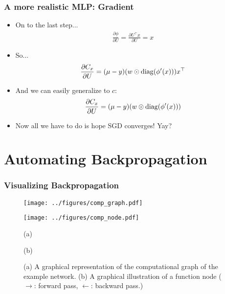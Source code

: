 \documentclass{beamer}
\begin{document}
\begin{frame}

\frametitle{A more realistic MLP: Gradient}


\begin{itemize}
\item On to the last step...
\begin{align*}
    \frac{\partial \underline{\phi}}{\partial U} = \frac{\partial U^\top
    x}{\partial U} = x
\end{align*}
\item So...
\begin{align} 
    \frac{\partial C_x}{\partial U} = (\mu - y) (w \odot \operatorname{diag}(\phi'(x)))
    x^\top
\end{align}
\item And we can easily generalize to $c$:
\begin{align} 
    \frac{\partial C_x}{\partial U} = (\mu - y) (w \odot \operatorname{diag}(\phi'(x)))
\end{align}
\item Now all we have to do is hope SGD converges! Yay?
\end{itemize}

\end{frame}

\section{Automating Backpropagation}

\begin{frame}
\frametitle{Visualizing Backpropagation}

\begin{figure}[ht]
    \centering
    \begin{minipage}{0.48\textwidth}
        \centering
        \texttt{[image: ../figures/comp\_graph.pdf]}
    \end{minipage}
    \hfill
    \begin{minipage}{0.48\textwidth}
        \centering
        \texttt{[image: ../figures/comp\_node.pdf]}
    \end{minipage}

    \begin{minipage}{0.48\textwidth}
        \centering
        (a)
    \end{minipage}
    \hfill
    \begin{minipage}{0.48\textwidth}
        \centering
        (b)
    \end{minipage}
    \caption{(a) A graphical representation of the computational graph of the
    example network. (b) A graphical illustration
    of a function node ({\color{blue} $\to$}: forward pass, {\color{red}
$\leftarrow$}: backward pass.)}
\end{figure}

\end{frame}
\end{document}
